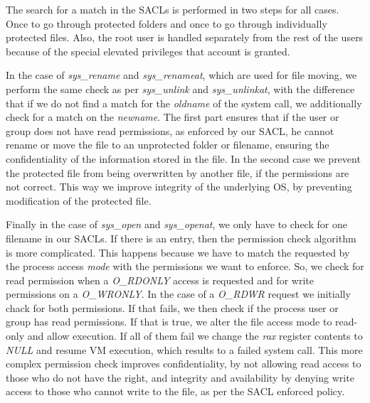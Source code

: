 \par The search for a match in the \ac{SACL}s is performed in two steps for all cases. Once to go through protected folders and once to go through individually protected files. Also, the root user is handled separately from the rest of the users because of the special elevated privileges that account is granted. 

\par In the case of \textit{sys\_rename} and \textit{sys\_renameat}, which are used for file moving, we perform the same check as per \textit{sys\_unlink} and \textit{sys\_unlinkat}, with the difference that if we do not find a match for the \textit{oldname} of the system call, we additionally check for a match on the \textit{newname}. The first part ensures that if the user or group does not have read permissions, as enforced by our \ac{SACL}, he cannot rename or move the file to an unprotected folder or filename, ensuring the confidentiality of the information stored in the file. In the second case we prevent the protected file from being overwritten by another file, if the permissions are not correct. This way we improve integrity of the underlying \ac{OS}, by preventing modification of the protected file. 

\par Finally in the case of \textit{sys\_open} and \textit{sys\_openat}, we only have to check for one filename in our \ac{SACL}s. If there is an entry, then the permission check algorithm is more complicated. This happens because we have to match the requested by the process access \textit{mode} with the permissions we want to enforce. So, we check for read permission when a \textit{O\_RDONLY} access is requested and for write permissions on a \textit{O\_WRONLY}. In the case of a \textit{O\_RDWR} request we initially chack for both permissions. If that fails, we then check if the process user or group has read permissions. If that is true, we alter the file access mode to read-only and allow execution. If all of them fail we change the \textit{rax} register contents to \textit{NULL} and resume \ac{VM} execution, which results to a failed system call. This more complex permission check improves confidentiality, by not allowing read access to those who do not have the right, and integrity and availability by denying write access to those who cannot write to the file, as per the \ac{SACL} enforced policy.